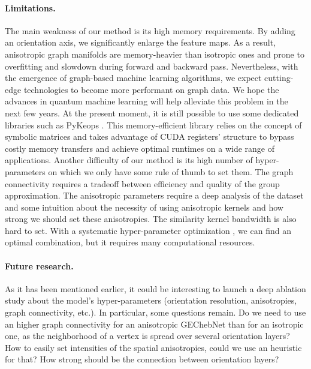 \documentclass{article}
\newcommand{\haguettaz}[1]{{\color[rgb]{.8,.3,.2}{#1}}}
\begin{document}
\paragraph{Limitations.} The main weakness of our method is its high memory requirements. By adding an orientation axis, we significantly enlarge the feature maps. As a result, anisotropic graph manifolds are memory-heavier than isotropic ones and prone to overfitting and slowdown during forward and backward pass. Nevertheless, with the emergence of graph-based machine learning algorithms, we expect cutting-edge technologies to become more performant on graph data. We hope the advances in quantum machine learning will help alleviate this problem in the next few years. At the present moment, it is still possible to use some dedicated libraries such as PyKeops \citep{charlier2020kernel}. This memory-efficient library relies on the concept of symbolic matrices and takes advantage of CUDA registers' structure to bypass costly memory transfers and achieve optimal runtimes on a wide range of applications. Another difficulty of our method is its high number of hyper-parameters on which we only have some rule of thumb to set them. The graph connectivity requires a tradeoff between efficiency and quality of the group approximation. The anisotropic parameters require a deep analysis of the dataset and some intuition about the necessity of using anisotropic kernels and how strong we should set these anisotropies. The similarity kernel bandwidth is also hard to set. With a systematic hyper-parameter optimization \citep{yu2020hyper}, we can find an optimal combination, but it requires many computational resources.


\paragraph{Future research.} As it has been mentioned earlier, it could be interesting to launch a deep ablation study about the model's hyper-parameters (orientation resolution, anisotropies, graph connectivity, etc.). In particular, some questions remain. Do we need to use an higher graph connectivity for an anisotropic GEChebNet than for an isotropic one, as the neighborhood of a vertex is spread over several orientation layers? How to easily set intensities of the spatial anisotropies, could we use an heuristic for that? How strong should be the connection between orientation layers? 

\haguettaz{convergence of graph laplacian to anisotropic Laplace Beltrami operator?}
\end{document}
